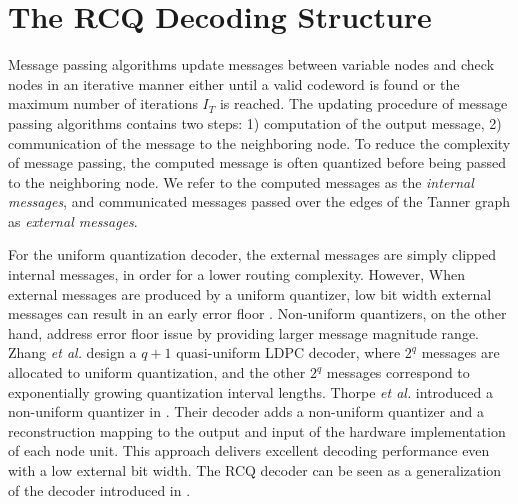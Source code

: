 \documentclass [PhD] {uclathes}
\begin{document}
\section{The RCQ Decoding Structure}\label{sec: RCQ-decoding-stru}
Message passing algorithms update messages between variable nodes and check nodes in an iterative manner either until a valid codeword is found or the maximum number of iterations $I_T$ is reached. 
The updating procedure of message passing algorithms contains two steps: 1) computation of the output message, 2) communication of the message to the neighboring node. To reduce the complexity of message passing, the computed message is often quantized  before being passed  to the neighboring node.  We refer to the computed messages as the \textit{internal messages}, and communicated messages passed over the edges of the Tanner graph as  \textit{external messages}.

For the uniform quantization decoder, the external messages are simply clipped internal messages, in order for a lower routing complexity. However, 
When external messages are produced by a uniform quantizer, low bit width external messages can result in an early error floor \cite{Zhang_q1quasi}.
Non-uniform quantizers, on the other hand, address error floor issue by providing larger message magnitude range.
Zhang \emph{et al.} design a $q+1$ quasi-uniform LDPC decoder, where $2^q$ messages are allocated to uniform quantization, and the other $2^q$ messages correspond to exponentially growing quantization interval lengths\cite{Zhang_q1quasi}. 
Thorpe \emph{et al.} introduced a non-uniform quantizer in \cite{-_Lee2005-MIMQBP}.  Their decoder adds a non-uniform quantizer and a reconstruction mapping to the output and input of the hardware implementation of each node unit. 
This approach delivers excellent decoding performance even with a low external bit width.  The RCQ decoder \cite{Wang2020-RCQ} can be seen as a generalization of the decoder introduced in \cite{-_Lee2005-MIMQBP}.
\end{document}
